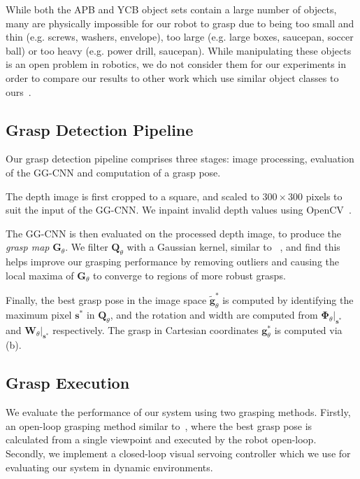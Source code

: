 \documentclass[conference]{IEEEtran}
\newcommand{\cG}{\mathbf{G}}
\newcommand{\cQ}{\mathbf{Q}}
\newcommand{\cW}{\mathbf{W}}
\newcommand{\bPhi}{\mathbf{\Phi}}
\newcommand{\bg}{\mathbf{g}}
\newcommand{\bgt}{\tilde{\mathbf{g}}}
\newcommand{\bs}{\mathbf{s}}
\begin{document}
While both the APB and YCB object sets contain a large number of objects, many are physically impossible for our robot to grasp due to being too small and thin (e.g. screws, washers, envelope), too large (e.g. large boxes, saucepan, soccer ball) or too heavy (e.g. power drill, saucepan).
While manipulating these objects is an open problem in robotics, we do not consider them for our experiments in order to compare our results to other work which use similar object classes to ours~\cite{Johns2016DeepUncertainty, Lenz2015DeepGrasps,Levine2017LearningCollection, Mahler2017Dex2, Pinto2016SupersizingHours}.


\subsection{Grasp Detection Pipeline}
\label{sec:pipeline}

Our grasp detection pipeline comprises three stages: image processing, evaluation of the GG-CNN and computation of a grasp pose.

The depth image is first cropped to a square, and scaled to $300\times300$ pixels to suit the input of the GG-CNN.  We inpaint invalid depth values using OpenCV~\cite{opencv_library}. 

The GG-CNN is then evaluated on the processed depth image, to produce the \textit{grasp map} $\cG_\theta$.  We filter $\cQ_\theta$ with a Gaussian kernel, similar to ~\cite{Johns2016DeepUncertainty}, and find this helps improve our grasping performance by removing outliers and causing the local maxima of $\cG_\theta$ to converge to regions of more robust grasps.

Finally, the best grasp pose in the image space $\bgt^*_\theta$ is computed by identifying the maximum pixel $\bs^*$ in $\cQ_\theta$, and the rotation and width are computed from $\bPhi_\theta |_{\bs^*}$ and $\cW_\theta |_{\bs^*}$ respectively.  The grasp in Cartesian coordinates $\bg^*_\theta$ is computed via  (b).

\subsection{Grasp Execution}

We evaluate the performance of our system using two grasping methods.  Firstly, an open-loop grasping method similar to~\cite{Lenz2015DeepGrasps, Pinto2016SupersizingHours, Mahler2017Dex2}, where the best grasp pose is calculated from a single viewpoint and executed by the robot open-loop.  Secondly, we implement a closed-loop visual servoing controller which we use for evaluating our system in dynamic environments.
\end{document}
